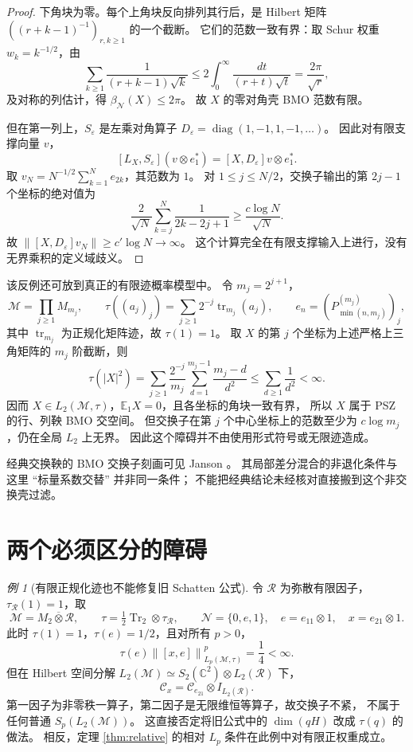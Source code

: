 \documentclass[UTF8,11pt,a4paper,fontset=fandol]{ctexart}
\theoremstyle{remark}
\newtheorem{example}[theorem]{例}
\numberwithin{equation}{section}
\newcommand{\M}{\mathcal M}
\newcommand{\N}{\mathcal N}
\newcommand{\CC}{\mathcal C}
\newcommand{\E}{\mathbb E}
\newcommand{\Tr}{\operatorname{Tr}}
\newcommand{\norm}[1]{\left\lVert #1\right\rVert}
\begin{document}
\begin{proof}
下角块为零。每个上角块反向排列其行后，是 Hilbert 矩阵
$((r+k-1)^{-1})_{r,k\geq1}$ 的一个截断。
它们的范数一致有界：取 Schur 权重 $w_k=k^{-1/2}$，由
\[
 \sum_{k\geq1}\frac{1}{(r+k-1)\sqrt k}
 \leq2\int_0^\infty\frac{dt}{(r+t)\sqrt t}
 =\frac{2\pi}{\sqrt r},
\]
及对称的列估计，得 $\beta_\N(X)\leq2\pi$。
故 $X$ 的零对角壳 BMO 范数有限。

但在第一列上，$S_\varepsilon$ 是左乘对角算子
$D_\varepsilon=\operatorname{diag}(1,-1,1,-1,\ldots)$。
因此对有限支撑向量 $v$，
\[
 [L_X,S_\varepsilon](v\otimes e_1^*)
 =[X,D_\varepsilon]v\otimes e_1^*.
\]
取 $v_N=N^{-1/2}\sum_{k=1}^N e_{2k}$，其范数为 $1$。
对 $1\leq j\leq N/2$，交换子输出的第 $2j-1$ 个坐标的绝对值为
\[
 \frac{2}{\sqrt N}\sum_{k=j}^N\frac{1}{2k-2j+1}
 \geq\frac{c\log N}{\sqrt N}.
\]
故 $\norm{[X,D_\varepsilon]v_N}\geq c'\log N\to\infty$。
这个计算完全在有限支撑输入上进行，没有无界乘积的定义域歧义。
\end{proof}

该反例还可放到真正的有限迹概率模型中。
令 $m_j=2^{j+1}$，
\[
 \M=\prod_{j\geq1}M_{m_j},\qquad
 \tau((a_j)_j)=\sum_{j\geq1}2^{-j}\operatorname{tr}_{m_j}(a_j),\qquad
 e_n=(P_{\min(n,m_j)}^{(m_j)})_j,
\]
其中 $\operatorname{tr}_{m_j}$ 为正规化矩阵迹，故 $\tau(1)=1$。
取 $X$ 的第 $j$ 个坐标为上述严格上三角矩阵的 $m_j$ 阶截断，则
\[
 \tau(|X|^2)
 =\sum_{j\geq1}\frac{2^{-j}}{m_j}
    \sum_{d=1}^{m_j-1}\frac{m_j-d}{d^2}
 \leq\sum_{d\geq1}\frac1{d^2}<\infty.
\]
因而 $X\in L_2(\M,\tau)$，$\E_1X=0$，且各坐标的角块一致有界，
所以 $X$ 属于 PSZ 的行、列鞅 BMO 交空间。
但交换子在第 $j$ 个中心坐标上的范数至少为 $c\log m_j$，仍在全局 $L_2$ 上无界。
因此这个障碍并不由使用形式符号或无限迹造成。

经典交换鞅的 BMO 交换子刻画可见 Janson \cite{Janson}。
其局部差分混合的非退化条件与这里 ``标量系数交替'' 并非同一条件；
不能把经典结论未经核对直接搬到这个非交换壳过滤。

\section{两个必须区分的障碍}

\begin{example}[有限正规化迹也不能修复旧 Schatten 公式]\label{ex:II}
令 $\mathcal R$ 为弥散有限因子，$\tau_{\mathcal R}(1)=1$，取
\[
 \M=M_2\overline\otimes\mathcal R,\qquad
 \tau=\tfrac12\Tr_2\otimes\tau_{\mathcal R},\qquad
 \N=\{0,e,1\},\quad e=e_{11}\otimes1,\quad x=e_{21}\otimes1.
\]
此时 $\tau(1)=1$，$\tau(e)=1/2$，且对所有 $p>0$，
\[
 \tau(e)\norm{[x,e]}_{L_p(\M,\tau)}^p=\frac14<\infty.
\]
但在 Hilbert 空间分解
$L_2(\M)\simeq S_2(\mathbb C^2)\otimes L_2(\mathcal R)$ 下，
\[
 \CC_x=\CC_{e_{21}}\otimes I_{L_2(\mathcal R)}.
\]
第一因子为非零秩一算子，第二因子是无限维恒等算子，故交换子不紧，
不属于任何普通 $S_p(L_2(\M))$。
这直接否定将旧公式中的 $\dim(qH)$ 改成 $\tau(q)$ 的做法。
相反，定理 \ref{thm:relative} 的相对 $L_p$ 条件在此例中对有限正权重成立。
\end{example}
\end{document}
